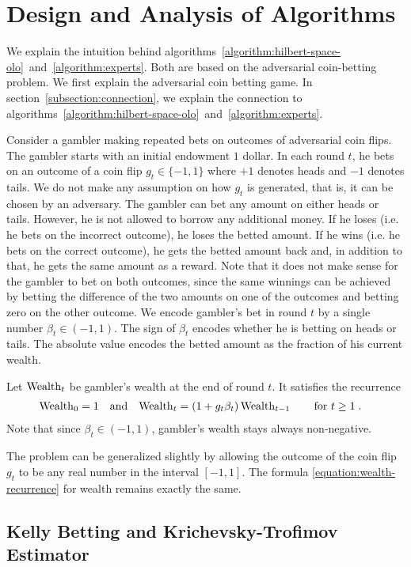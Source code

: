 \section{Design and Analysis of Algorithms}

We explain the intuition behind
algorithms~\ref{algorithm:hilbert-space-olo}~and~\ref{algorithm:experts}.  Both
are based on the adversarial coin-betting problem. We first explain the
adversarial coin betting game. In section~\ref{subsection:connection}, we
explain the connection to
algorithms~\ref{algorithm:hilbert-space-olo}~and~\ref{algorithm:experts}.

Consider a gambler making repeated bets on outcomes of adversarial coin flips.
The gambler starts with an initial endowment $1$ dollar. In each round $t$, he
bets on an outcome of a coin flip $g_t \in \{-1,1\}$ where $+1$ denotes heads
and $-1$ denotes tails. We do not make any assumption on how $g_t$ is
generated, that is, it can be chosen by an adversary.  The gambler can bet any
amount on either heads or tails. However, he is not allowed to borrow any
additional money. If he loses (i.e. he bets on the incorrect outcome), he loses
the betted amount. If he wins (i.e. he bets on the correct outcome), he gets
the betted amount back and, in addition to that, he gets the same amount as a
reward. Note that it does not make sense for the gambler to bet on both
outcomes, since the same winnings can be achieved by betting the difference of
the two amounts on one of the outcomes and betting zero on the other outcome.
We encode gambler's bet in round $t$ by a single number $\beta_t \in (-1,1)$.
The sign of $\beta_t$ encodes whether he is betting on heads or tails. The
absolute value encodes the betted amount as the fraction of his current wealth.

Let $\operatorname{Wealth}_t$ be gambler's wealth at the end of round $t$. It satisfies the
recurrence
\begin{align}
\label{equation:wealth-recurrence}
\operatorname{Wealth}_0 & = 1 &
& \text{and} &
\operatorname{Wealth}_t & = (1 + g_t \beta_t) \operatorname{Wealth}_{t-1} \qquad \text{for $t \ge 1$} \; .
\end{align}
Note that since $\beta_t \in (-1,1)$, gambler's wealth stays always non-negative.

The problem can be generalized slightly by allowing the outcome of the coin
flip $g_t$ to be any real number in the interval $[-1,1]$. The formula
\eqref{equation:wealth-recurrence} for wealth remains exactly the same.

\subsection{Kelly Betting and Krichevsky-Trofimov Estimator}

